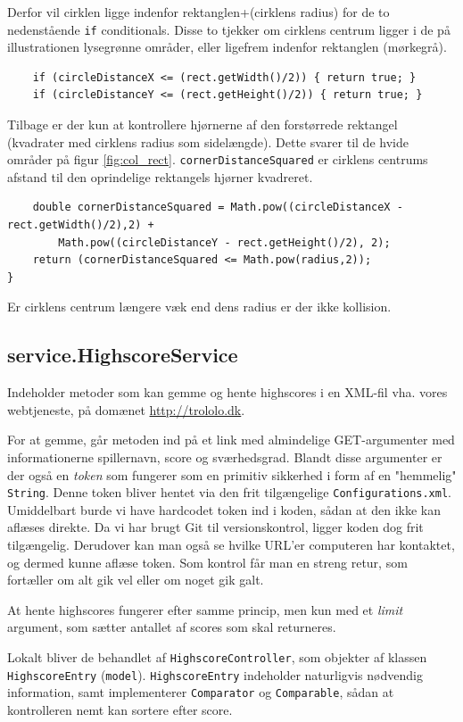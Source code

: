 \documentclass[titlepage,danish]{article}
\newcommand{\code}[1]{\texttt{#1}}
\begin{document}
Derfor vil cirklen ligge indenfor rektanglen+(cirklens radius) for de to nedenstående \code{if}
conditionals. Disse to tjekker om cirklens centrum ligger i de på illustrationen lysegrønne områder,
eller ligefrem indenfor rektanglen (mørkegrå).
\begin{verbatim}
    if (circleDistanceX <= (rect.getWidth()/2)) { return true; } 
    if (circleDistanceY <= (rect.getHeight()/2)) { return true; }
\end{verbatim}	    
Tilbage er der kun at kontrollere hjørnerne af den forstørrede rektangel (kvadrater med cirklens
radius som sidelængde). Dette svarer til de hvide områder på figur \ref{fig:col_rect}.
\code{cornerDistanceSquared} er cirklens centrums afstand til den oprindelige rektangels hjørner
kvadreret.
\begin{verbatim}
    double cornerDistanceSquared = Math.pow((circleDistanceX - rect.getWidth()/2),2) + 
        Math.pow((circleDistanceY - rect.getHeight()/2), 2);
    return (cornerDistanceSquared <= Math.pow(radius,2));
}
\end{verbatim}
Er cirklens centrum længere væk end dens radius er der ikke kollision.


\subsection{service.HighscoreService}

Indeholder metoder som kan gemme og hente highscores i en XML-fil vha. vores webtjeneste, på domænet \url{http://trololo.dk}.

For at gemme, går metoden ind på et link med almindelige GET-argumenter med informationerne spillernavn, score og sværhedsgrad. Blandt disse argumenter er der også en \emph{token} som fungerer som en primitiv sikkerhed i form af en "hemmelig" \code{String}. Denne token bliver hentet via den frit tilgængelige \code{Configurations.xml}. Umiddelbart burde vi have hardcodet token ind i koden, sådan at den ikke kan aflæses direkte. Da vi har brugt Git til versionskontrol, ligger koden dog frit tilgængelig. Derudover kan man også se hvilke URL'er computeren har kontaktet, og dermed kunne aflæse token. Som kontrol får man en streng retur, som fortæller om alt gik vel eller om noget gik galt.

At hente highscores fungerer efter samme princip, men kun med et \emph{limit} argument, som sætter antallet af scores som skal returneres.

Lokalt bliver de behandlet af \code{HighscoreController}, som objekter af klassen \code{HighscoreEntry} (\code{model}). \code{HighscoreEntry} indeholder naturligvis nødvendig information, samt implementerer \code{Comparator} og \code{Comparable}, sådan at kontrolleren nemt kan sortere efter score.
\end{document}

